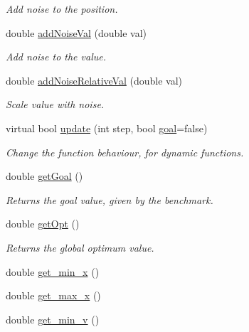 \begin{CompactItemize}
\begin{CompactList}\small\item\em Add noise to the position. \item\end{CompactList}\item 
double \hyperlink{classFunction_ecbc9e3a5181a8ba35af8c60a3b28c11}{addNoiseVal} (double val)
\begin{CompactList}\small\item\em Add noise to the value. \item\end{CompactList}\item 
double \hyperlink{classFunction_f19cf9d966785fd17c0c0b94d5483d99}{addNoiseRelativeVal} (double val)
\begin{CompactList}\small\item\em Scale value with noise. \item\end{CompactList}\item 
virtual bool \hyperlink{classFunction_31bae656cf84683529a1a8c19c9f0a67}{update} (int step, bool \hyperlink{classFunction_d9eec4e429707542493d16d83fcb7f54}{goal}=false)
\begin{CompactList}\small\item\em Change the function behaviour, for dynamic functions. \item\end{CompactList}\item 
double \hyperlink{classFunction_e6d1592d71358ccb6b1cab1e694ed52b}{getGoal} ()
\begin{CompactList}\small\item\em Returns the goal value, given by the benchmark. \item\end{CompactList}\item 
double \hyperlink{classFunction_cf92330874c4783b53c2d61733d418e5}{getOpt} ()
\begin{CompactList}\small\item\em Returns the global optimum value. \item\end{CompactList}\item 
double \hyperlink{classFunction_8831e5c15811e7090a9fcc2cdae162b6}{get\_\-min\_\-x} ()
\item 
double \hyperlink{classFunction_add009c15298f8cbbf62958f62e49b0e}{get\_\-max\_\-x} ()
\item 
double \hyperlink{classFunction_439c95846f893146177e7daee180e924}{get\_\-min\_\-v} ()

\end{CompactItemize}

